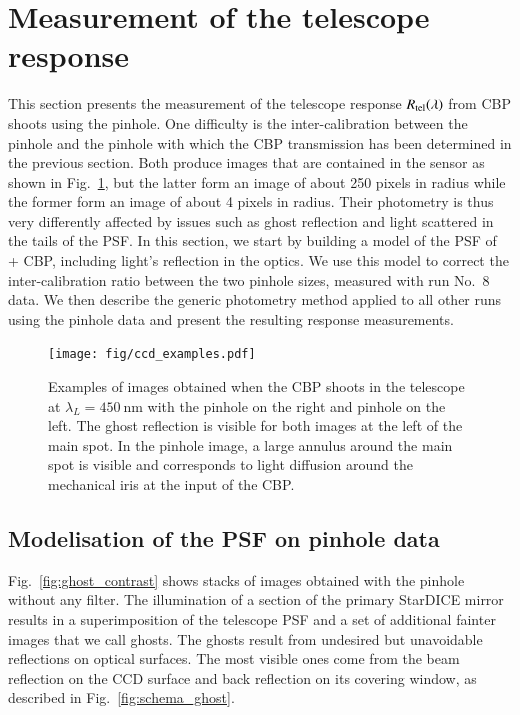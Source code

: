 \section{Measurement of the \SD telescope response}
\label{sec:rsd}
\label{sec:sd_datadesc}

This section presents the measurement of the \SD{} telescope response $R_{\mathrm{tel}}(\lambda)$ from CBP shoots using the \spinhole pinhole. One difficulty is the inter-calibration between the \spinhole pinhole and the \bpinhole pinhole with which the CBP transmission has been determined in the previous section. Both produce images that are contained in the \SD sensor as shown in Fig.~\ref{fig:ccd_examples}, but the latter form an image of about 250 pixels in radius while the former form an image of about 4 pixels in radius. Their photometry is thus very differently affected by issues such as ghost reflection and light scattered in the tails of the PSF. In this section, we start by building a model of the PSF of \SD+ CBP, including light's reflection in the optics. We use this model to correct the inter-calibration ratio between the two pinhole sizes, measured with run No.~8 data. We then describe the generic photometry method applied to all other runs using the \spinhole pinhole data and present the resulting response measurements.   

\begin{figure}[h]
    \centering
    \texttt{[image: fig/ccd\_examples.pdf]}
    \caption{Examples of images obtained when the CBP shoots in the \SD telescope at $\lambda_L=\SI{450}{\nm}$ with the \bpinhole pinhole on the right and \spinhole pinhole on the left. The ghost reflection is visible for both images at the left of the main spot. In the \bpinhole pinhole image, a large annulus around the main spot is visible and corresponds to light diffusion around the mechanical iris at the input of the CBP.}
    \label{fig:ccd_examples}
\end{figure}


\subsection{Modelisation of the \SD PSF on \spinhole pinhole data}
\label{sec:modelisation-sd-psf}

Fig.~\ref{fig:ghost_contrast} shows stacks of images obtained with the \spinhole pinhole without any filter. The illumination of a section of the primary StarDICE mirror results in a superimposition of the \SD telescope PSF and a set of additional fainter images that we call ghosts. The ghosts result from undesired but unavoidable reflections on optical surfaces. The most visible ones come from the beam reflection on the CCD surface and back reflection on its covering window, as described in Fig.~\ref{fig:schema_ghost}.\\

